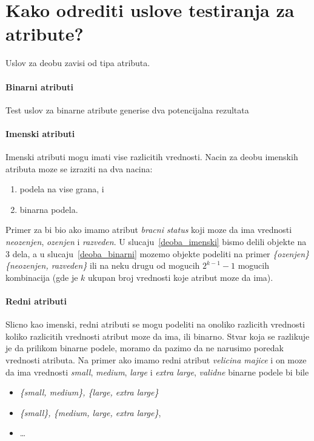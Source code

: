 \documentclass[a4paper]{article}
\begin{document}
\section{Kako odrediti uslove testiranja za atribute?}
Uslov za deobu zavisi od tipa atributa.

\paragraph{Binarni atributi} Test uslov za binarne atribute generise dva potencijalna rezultata

\paragraph{Imenski atributi} Imenski atributi mogu imati vise razlicitih vrednosti. Nacin za deobu
imenskih atributa moze se izraziti na dva nacina:
\begin{enumerate}
    \item\label{deoba_imenski} podela na vise grana, i
    \item\label{deoba_binarni} binarna podela.
\end{enumerate}
Primer za bi bio ako imamo atribut \emph{bracni status} koji moze da ima
vrednosti \emph{neozenjen}, \emph{ozenjen} i \emph{razveden}. U slucaju~\ref{deoba_imenski} bismo
delili objekte na 3 dela, a u slucaju~\ref{deoba_binarni} mozemo objekte podeliti na primer
\emph{\{ozenjen\} \{neozenjen, razveden\}} ili na neku drugu od mogucih \(2^{k-1}-1\) mogucih
kombinacija (gde je \(k\) ukupan broj vrednosti koje atribut moze da ima).

\paragraph{Redni atributi} Slicno kao imenski, redni atributi se mogu podeliti na onoliko razlicith
vrednosti koliko razlicitih vrednosti atribut moze da ima, ili binarno. Stvar koja se razlikuje je
da prilikom binarne podele, moramo da pazimo da ne narusimo poredak vrednosti atributa. Na primer
ako imamo redni atribut \emph{velicina majice} i on moze da ima vrednosti \emph{small},
\emph{medium}, \emph{large} i \emph{extra large}, \emph{validne} binarne podele bi bile
\begin{itemize}
    \item \emph{\{small, medium\}, \{large, extra large\}}
    \item \emph{\{small\}, \{medium, large, extra large\}},
    \item \ldots
\end{itemize}
 
\end{document}
